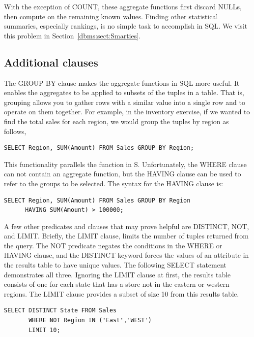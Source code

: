 With the exception of COUNT, these aggregate functions first discard
NULLs, then compute on the remaining known values.
Finding other statistical summaries, especially rankings, is
no simple task to accomplish in SQL. 
We visit this problem in Section~\ref{dbms:sect:Smarties}.

\subsection{Additional clauses}

The GROUP BY clause makes the aggregate functions in SQL more useful.
It enables the aggregates to be applied to subsets of the tuples in a table. 
That is, grouping allows you to gather rows with a similar value
into a single row and to operate on them together.
For example, in the inventory exercise, if we wanted to find the
total sales for each region, we would group the tuples by region
as follows,
\begin{verbatim}
SELECT Region, SUM(Amount) FROM Sales GROUP BY Region;
\end{verbatim}

This functionality parallels the  function in S.
Unfortunately, the WHERE clause can not contain an aggregate function,
but the HAVING clause can be used to refer to the groups to be selected.
The syntax for the HAVING clause is:
\begin{verbatim}
SELECT Region, SUM(Amount) FROM Sales GROUP BY Region
      HAVING SUM(Amount) > 100000;
\end{verbatim}

A few other predicates and clauses that may prove helpful are
DISTINCT, NOT, and LIMIT.
Briefly, the LIMIT clause, limits the number of tuples returned 
from the query.
The NOT predicate negates the conditions in the WHERE or HAVING clause,
and the DISTINCT keyword forces the values of an attribute in the
results table to have unique values.
The following SELECT statement demonstrates all three.
Ignoring the LIMIT clause at first, the results table consists of 
one for each state that has a store not in the eastern or western regions.
The LIMIT clause provides a subset of size 10 from this results table.
\begin{verbatim}
SELECT DISTINCT State FROM Sales 
       WHERE NOT Region IN ('East','WEST')
       LIMIT 10;
\end{verbatim}

